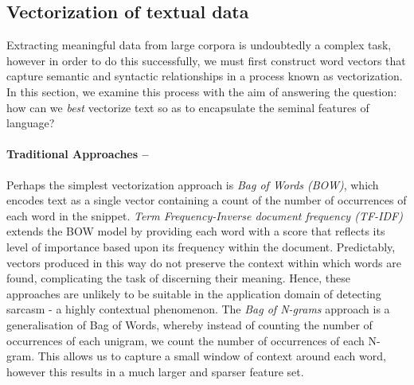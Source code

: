 \documentclass[12pt,a4paper]{article}
\begin{document}
\subsection{Vectorization of textual data}
\noindent Extracting meaningful data from large corpora is undoubtedly a complex task, however in order to do this successfully, we must first construct word vectors that capture semantic and syntactic relationships in a process known as vectorization. In this section, we examine this process with the aim of answering the question: how can we \textit{best} vectorize text so as to encapsulate the seminal features of language?


\paragraph{Traditional Approaches --}
\noindent Perhaps the simplest vectorization approach is \textit{Bag of Words (BOW)}, which encodes text as a single vector containing a count of the number of occurrences of each word in the snippet. \textit{Term Frequency-Inverse document frequency (TF-IDF)} \cite{robertson1976relevance} extends the BOW model by providing each word with a score that reflects its level of importance based upon its frequency within the document. Predictably, vectors produced in this way do not preserve the context within which words are found, complicating the task of discerning their meaning. Hence, these approaches are unlikely to be suitable in the application domain of detecting sarcasm - a highly contextual phenomenon. The \textit{Bag of N-grams} approach is a generalisation of Bag of Words, whereby instead of counting the number of occurrences of each unigram, we count the number of occurrences of each N-gram. This allows us to capture a small window of context around each word, however this results in a much larger and sparser feature set.
\end{document}
